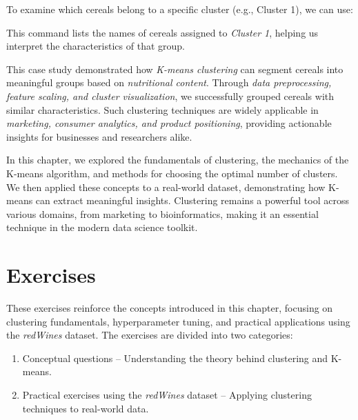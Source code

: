 \documentclass[
  11pt,
]{book}
\makeatletter
\newenvironment{Shaded}{}{}
\newcommand{\DecValTok}[1]{#1}
\newcommand{\NormalTok}[1]{#1}
\newcommand{\SpecialCharTok}[1]{\textcolor[rgb]{0.39,0.39,0.39}{#1}}
\providecommand{\tightlist}{%
  \setlength{\itemsep}{0pt}\setlength{\parskip}{0pt}}
\newenvironment{kframe}{%
\medskip{}
\setlength{\fboxsep}{.8em}
 \def\at@end@of@kframe{}%
 \ifinner\ifhmode%
  \def\at@end@of@kframe{\end{minipage}}%
  \begin{minipage}{\columnwidth}%
 \fi\fi%
 \def\FrameCommand##1{\hskip\@totalleftmargin \hskip-\fboxsep
 \colorbox{shadecolor}{##1}\hskip-\fboxsep
     \hskip-\linewidth \hskip-\@totalleftmargin \hskip\columnwidth}%
 \MakeFramed {\advance\hsize-\width
   \@totalleftmargin\z@ \linewidth\hsize
   \@setminipage}}%
 {\par\unskip\endMakeFramed%
 \at@end@of@kframe}
\renewenvironment{Shaded}{\begin{kframe}}{\end{kframe}}
\theoremstyle{definition}
\theoremstyle{definition}
\theoremstyle{definition}
\theoremstyle{definition}
\theoremstyle{remark}
\makeatother
\begin{document}
To examine which cereals belong to a specific cluster (e.g., Cluster 1), we can use:

\begin{Shaded}
\end{Shaded}

This command lists the names of cereals assigned to \emph{Cluster 1}, helping us interpret the characteristics of that group.

This case study demonstrated how \emph{K-means clustering} can segment cereals into meaningful groups based on \emph{nutritional content}. Through \emph{data preprocessing, feature scaling, and cluster visualization}, we successfully grouped cereals with similar characteristics. Such clustering techniques are widely applicable in \emph{marketing, consumer analytics, and product positioning}, providing actionable insights for businesses and researchers alike.

In this chapter, we explored the fundamentals of clustering, the mechanics of the K-means algorithm, and methods for choosing the optimal number of clusters. We then applied these concepts to a real-world dataset, demonstrating how K-means can extract meaningful insights. Clustering remains a powerful tool across various domains, from marketing to bioinformatics, making it an essential technique in the modern data science toolkit.

\section*{Exercises}\label{exercises-9}


These exercises reinforce the concepts introduced in this chapter, focusing on clustering fundamentals, hyperparameter tuning, and practical applications using the \emph{redWines} dataset. The exercises are divided into two categories:

\begin{enumerate}
\def\labelenumi{\arabic{enumi}.}
\tightlist
\item
  Conceptual questions -- Understanding the theory behind clustering and K-means.\\
\item
  Practical exercises using the \emph{redWines} dataset -- Applying clustering techniques to real-world data.
\end{enumerate}
\end{document}
